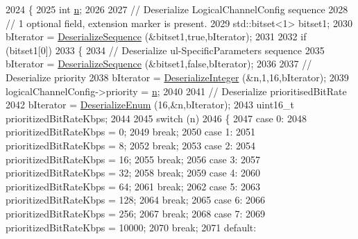 \begin{DoxyCode}
2024 \{
2025   \textcolor{keywordtype}{int} \hyperlink{namespacesample-rng-plot_aeb5ee5c431e338ef39b7ac5431242e1d}{n};
2026 
2027   \textcolor{comment}{// Deserialize LogicalChannelConfig sequence}
2028   \textcolor{comment}{// 1 optional field, extension marker is present.}
2029   std::bitset<1> bitset1;
2030   bIterator = \hyperlink{classns3_1_1Asn1Header_a58c68bb97ba3fe2e8fcdd7c208d672b2}{DeserializeSequence} (&bitset1,\textcolor{keyword}{true},bIterator);
2031 
2032   \textcolor{keywordflow}{if} (bitset1[0])
2033     \{
2034       \textcolor{comment}{// Deserialize ul-SpecificParameters sequence}
2035       bIterator = \hyperlink{classns3_1_1Asn1Header_a58c68bb97ba3fe2e8fcdd7c208d672b2}{DeserializeSequence} (&bitset1,\textcolor{keyword}{false},bIterator);
2036 
2037       \textcolor{comment}{// Deserialize priority}
2038       bIterator = \hyperlink{classns3_1_1Asn1Header_a49802c9af30018b078150e866b6ecae2}{DeserializeInteger} (&n,1,16,bIterator);
2039       logicalChannelConfig->priority = \hyperlink{namespacesample-rng-plot_aeb5ee5c431e338ef39b7ac5431242e1d}{n};
2040 
2041       \textcolor{comment}{// Deserialize prioritisedBitRate}
2042       bIterator = \hyperlink{classns3_1_1Asn1Header_a4fcc253e0eec3483c775b005c1875f2d}{DeserializeEnum} (16,&n,bIterator);
2043       uint16\_t prioritizedBitRateKbps;
2044 
2045       \textcolor{keywordflow}{switch} (n)
2046         \{
2047         \textcolor{keywordflow}{case} 0:
2048           prioritizedBitRateKbps = 0;
2049           \textcolor{keywordflow}{break};
2050         \textcolor{keywordflow}{case} 1:
2051           prioritizedBitRateKbps = 8;
2052           \textcolor{keywordflow}{break};
2053         \textcolor{keywordflow}{case} 2:
2054           prioritizedBitRateKbps = 16;
2055           \textcolor{keywordflow}{break};
2056         \textcolor{keywordflow}{case} 3:
2057           prioritizedBitRateKbps = 32;
2058           \textcolor{keywordflow}{break};
2059         \textcolor{keywordflow}{case} 4:
2060           prioritizedBitRateKbps = 64;
2061           \textcolor{keywordflow}{break};
2062         \textcolor{keywordflow}{case} 5:
2063           prioritizedBitRateKbps = 128;
2064           \textcolor{keywordflow}{break};
2065         \textcolor{keywordflow}{case} 6:
2066           prioritizedBitRateKbps = 256;
2067           \textcolor{keywordflow}{break};
2068         \textcolor{keywordflow}{case} 7:
2069           prioritizedBitRateKbps = 10000;
2070           \textcolor{keywordflow}{break};
2071         \textcolor{keywordflow}{default}:

\end{DoxyCode}
